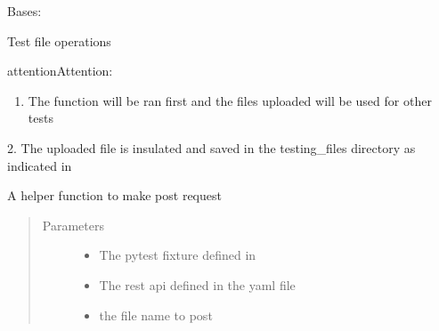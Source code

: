 \documentclass[letterpaper,10pt,english]{sphinxmanual}
\begin{document}
\begin{fulllineitems}
\label{\detokenize{tests:tests.test_cloudmesh.TestFileOperations}}
Bases: 

Test file operations

\begin{sphinxadmonition}{attention}{Attention:}\begin{enumerate}
%
\item {} 
The function will be ran first and the files uploaded will be used for other tests

\end{enumerate}

2. The uploaded file is insulated and saved in the testing\_files directory as indicated in
{\hyperref[\detokenize{tests:module-tests.conftest}]{}}
\end{sphinxadmonition}

\begin{fulllineitems}
\label{\detokenize{tests:tests.test_cloudmesh.TestFileOperations.post_file}}
A helper function to make post request
\begin{quote}\begin{description}
\item[{Parameters}] \leavevmode\begin{itemize}
\item {} 
 \textendash{} The pytest fixture defined in {\hyperref[\detokenize{tests:module-tests.conftest}]{}}

\item {} 
 \textendash{} The rest api defined in the yaml file

\item {} 
 \textendash{} the file name to post

\end{itemize}


\end{description}
\end{quote}
\end{fulllineitems}
\end{fulllineitems}
\end{document}
